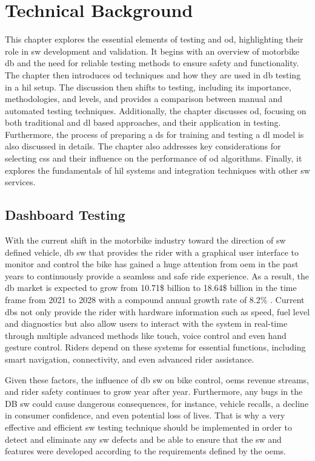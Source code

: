 \chapter{Technical Background}
This chapter explores the essential elements of testing and \gls{od}, highlighting their role in \gls{sw} development and validation. It begins with an overview of motorbike \gls{db} and the need for reliable testing methods to ensure safety and functionality. The chapter then introduces \gls{od} techniques and how they are used in \gls{db} testing in a \gls{hil} setup. The discussion then shifts to testing, including its importance, methodologies, and levels, and provides a comparison between manual and automated testing techniques. Additionally, the chapter discusses \gls{od}, focusing on both traditional and \gls{dl} based approaches, and their application in testing. Furthermore, the process of preparing a \gls{ds} for training and testing a \gls{dl} model is also discussed in details. The chapter also addresses key considerations for selecting \gls{cs}s and their influence on the performance of \gls{od} algorithms. Finally, it explores the fundamentals of \gls{hil} systems and integration techniques with other \gls{sw} services.

\section{Dashboard Testing}
With the current shift in the motorbike industry toward the direction of \gls{sw} defined vehicle, \gls{db} \gls{sw} that provides the rider with a graphical user interface to monitor and control the bike has gained a huge attention from \gls{oem} in the past years to continuously provide a seamless and safe ride experience. As a result, the \gls{db} market is expected to grow from 10.71\$ billion to 18.64\$ billion in the time frame from 2021 to 2028 with a compound annual growth rate of 8.2\% \cite{DL_HMI_SW_V}. Current \gls{db}s not only provide the rider with hardware information such as speed, fuel level and diagnostics but also allow users to interact with the system in real-time through multiple advanced methods like touch, voice control and even hand gesture control.  Riders depend on these systems for essential functions, including smart navigation, connectivity, and even advanced rider assistance.

Given these factors, the influence of \gls{db} \gls{sw} on bike control, \gls{oem}s revenue streams, and rider safety continues to grow year after year. Furthermore, any bugs in the DB \gls{sw} could cause dangerous consequences, for instance, vehicle recalls, a decline in consumer confidence, and even potential loss of lives. That is why a very effective and efficient \gls{sw} testing technique should be implemented in order to detect and eliminate any \gls{sw} defects and be able to ensure that the \gls{sw} and features were developed according to the requirements defined by the \gls{oem}s.

